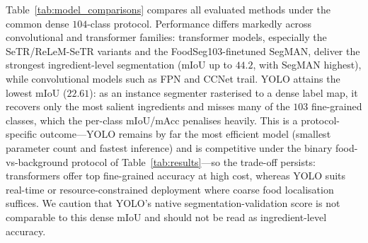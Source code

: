 \documentclass[preprint,12pt]{elsarticle}
\begin{document}
Table~\ref{tab:model_comparisons} compares all evaluated methods under the common dense $104$-class protocol. Performance differs markedly across convolutional and transformer families: transformer models, especially the SeTR/ReLeM-SeTR variants and the FoodSeg103-finetuned SegMAN, deliver the strongest ingredient-level segmentation (mIoU up to $44.2$, with SegMAN highest), while convolutional models such as FPN and CCNet trail. YOLO attains the lowest mIoU ($22.61$): as an instance segmenter rasterised to a dense label map, it recovers only the most salient ingredients and misses many of the $103$ fine-grained classes, which the per-class mIoU/mAcc penalises heavily. This is a protocol-specific outcome---YOLO remains by far the most efficient model (smallest parameter count and fastest inference) and is competitive under the binary food-vs-background protocol of Table~\ref{tab:results}---so the trade-off persists: transformers offer top fine-grained accuracy at high cost, whereas YOLO suits real-time or resource-constrained deployment where coarse food localisation suffices. We caution that YOLO's native segmentation-validation score is not comparable to this dense mIoU and should not be read as ingredient-level accuracy.
\end{document}

